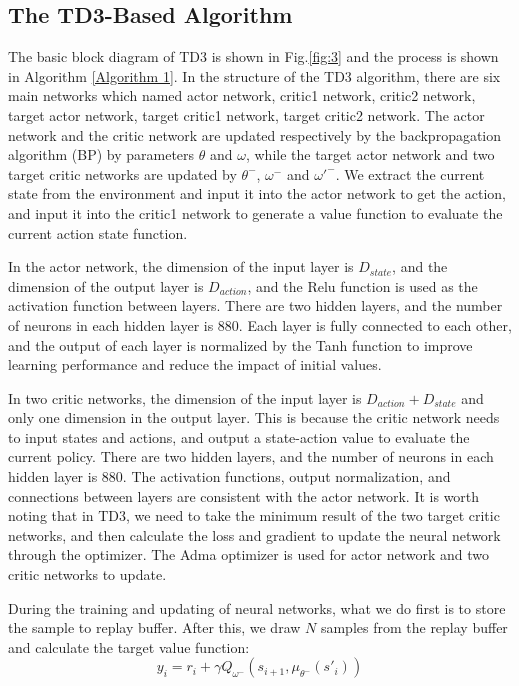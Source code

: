 \documentclass[conference]{IEEEtran}
\begin{document}
  \subsection{The TD3-Based Algorithm}
     The basic block diagram of TD3 is shown in Fig.\ref{fig:3} and the process is 
     shown in Algorithm \ref{Algorithm 1}. In the structure of the TD3 algorithm, there are 
     six main networks which named actor network, critic1 network, critic2 network, target actor 
     network, target critic1 network, target critic2 network. The actor network and the critic 
     network are updated respectively by the backpropagation algorithm (BP) by parameters 
     $\theta $ and $\omega $, while the target actor network and two target critic networks are 
     updated by ${\theta ^ - }$, ${\omega ^ - }$ and ${{\omega'} ^ - }$. We extract the current state from the 
     environment and input it into the actor network to get the action, and input it 
     into the critic1 network to generate a value function to evaluate the 
     current action state function.

     In the actor network, the dimension of the input layer is ${D_{state}}$, 
     and the dimension of the output layer is ${D_{action}}$, and the 
     Relu function 
     is used as the activation function between layers. There are two 
     hidden layers, and the number of neurons in each hidden layer is 880. 
     Each layer is fully connected to each other, and the output of each layer is 
     normalized by the Tanh function to improve learning performance and reduce the impact of 
     initial values\cite{18}.

     In two critic networks, the dimension of the input layer is 
     ${D_{action}} + {D_{state}}$ and 
     only one dimension in the output layer. This is because the critic 
     network needs to input states and actions, and output a state-action 
     value to evaluate the current policy. There are two hidden layers, and 
     the number of neurons in each hidden layer is 880. The activation 
     functions, output normalization, and connections between layers are 
     consistent with the actor network. 
     It is worth noting that in TD3, we need to take the minimum result of the two target
     critic networks, and then calculate the loss and gradient to 
     update the neural network through the optimizer.
     The Adma optimizer is used for 
     actor network and two critic networks to update.

     During the training and updating of neural networks, what we do first 
     is to store the sample to replay buffer. After this, we draw $N$ samples 
     from the replay buffer and calculate the target value function:
       \begin{equation}
       {y_i} = {r_i} + \gamma {Q_{{\omega ^ - }}}({s_{i + 1}},{\mu _{{\theta ^ - }}}({s'}_i))
       \tag{20}
       \label{eq20}
       \end{equation}
\end{document}
